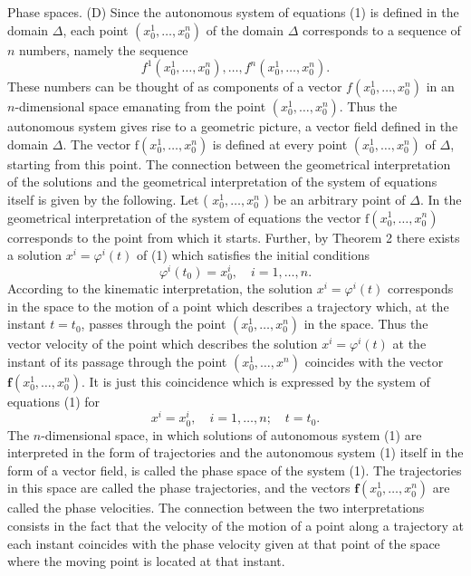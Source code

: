\documentclass[10pt,a5paper]{book}
\theoremstyle{plain}
\theoremstyle{definition}
\theoremstyle{remark}
\begin{document}
Phase spaces. (D) Since the autonomous system of equations (1) is defined in the domain $\Delta$, each point $\left(x_{0}^{1}, \ldots, x_{0}^{n}\right)$ of the domain $\Delta$ corresponds to a sequence of $n$ numbers, namely the sequence
\[
f^{1}\left(x_{0}^{1}, \ldots, x_{0}^{n}\right), \ldots, f^{n}\left(x_{0}^{1}, \ldots, x_{0}^{n}\right) .
\]
These numbers can be thought of as components of a vector $f\left(x_{0}^{1}, \ldots, x_{0}^{n}\right)$ in an $n$-dimensional space emanating from the point $\left(x_{0}^{1}, \ldots, x_{0}^{n}\right)$. Thus the autonomous system gives rise to a geometric picture, a vector field defined in the domain $\Delta$. The vector $\mathrm{f}\left(x_{0}^{1}, \ldots, x_{0}^{n}\right)$ is defined at every point $\left(x_{0}^{1}, \ldots, x_{0}^{n}\right)$ of $\Delta$, starting from this point. The connection between the geometrical interpretation of the solutions and the geometrical interpretation of the system of equations itself is given by the following. Let ( $x_{0}^{1}, \ldots, x_{0}^{n}$ ) be an arbitrary point of $\Delta$. In the geometrical interpretation of the system of equations the vector $\mathrm{f}\left(x_{0}^{1}, \ldots, x_{0}^{n}\right)$ corresponds to the
point from which it starts. Further, by Theorem 2 there exists a solution $x^{i}=\varphi^{i}(t)$ of (1) which satisfies the initial conditions
\[
\varphi^{i}\left(t_{0}\right)=x_{0}^{i}, \quad i=1, \ldots, n .
\]
According to the kinematic interpretation, the solution $x^{i}=\varphi^{i}(t)$ corresponds in the space to the motion of a point which describes a trajectory which, at the instant $t=t_{0}$, passes through the point $\left(x_{0}^{1}, \ldots, x_{0}^{n}\right)$ in the space. Thus the vector velocity of the point which describes the solution $x^{i}=\varphi^{i}(t)$ at the instant of its passage through the point $\left(x_{0}^{1}, \ldots, x^{n}\right)$ coincides with the vector $\mathbf{f}\left(x_{0}^{1}, \ldots, x_{0}^{n}\right)$. It is just this coincidence which is expressed by the system of equations (1) for
\[
x^{i}=x_{0}^{i}, \quad i=1, \ldots, n ; \quad t=t_{0} .
\]
The $n$-dimensional space, in which solutions of autonomous system (1) are interpreted in the form of trajectories and the autonomous system (1) itself in the form of a vector field, is called the phase space of the system (1). The trajectories in this space are called the phase trajectories, and the vectors $\mathbf{f}\left(x_{0}^{1}, \ldots, x_{0}^{n}\right)$ are called the phase velocities. The connection between the two interpretations consists in the fact that the velocity of the motion of a point along a trajectory at each instant coincides with the phase velocity given at that point of the space where the moving point is located at that instant.
\end{document}
